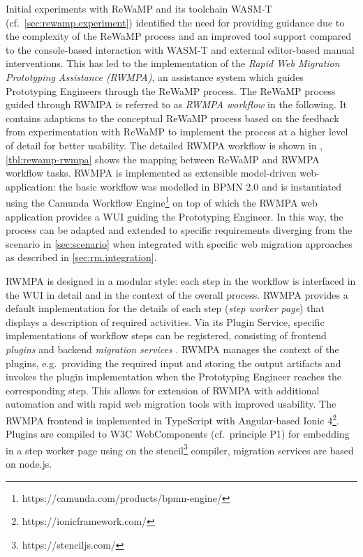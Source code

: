 Initial experiments with ReWaMP and its toolchain WASM-T (cf.~\cref{sec:rewamp.experiment}) identified the need for providing guidance due to the complexity of the ReWaMP process and an improved tool support compared to the console-based interaction with WASM-T and external editor-based manual interventions.
This has led to the implementation of the \emph{Rapid Web Migration Prototyping Assistance (RWMPA)}, an assistance system which guides Prototyping Engineers through the ReWaMP process.
The ReWaMP process guided through RWMPA is referred to as \emph{RWMPA workflow} in the following.
It contains adaptions to the conceptual ReWaMP process based on the feedback from experimentation with ReWaMP to implement the process at a higher level of detail for better usability.
The detailed RWMPA workflow is shown in , \cref{tbl:rewamp-rwmpa} shows the mapping between ReWaMP and RWMPA workflow tasks.
RWMPA is implemented as extensible model-driven web-application: the basic workflow was modelled in BPMN 2.0 and is instantiated using the Camunda Workflow Engine\footnote{https://camunda.com/products/bpmn-engine/} on top of which the RWMPA web application provides a WUI guiding the Prototyping Engineer.
In this way, the process can be adapted and extended to specific requirements diverging from the scenario in \cref{sec:scenario} when integrated with specific web migration approaches as described in \cref{sec:rm.integration}.

RWMPA is designed in a modular style: each step in the workflow is interfaced in the WUI in detail and in the context of the overall process.
RWMPA provides a default implementation for the details of each step (\emph{step worker page}) that displays a description of required activities.
Via its Plugin Service, specific implementations of workflow steps can be registered, consisting of frontend \emph{plugins} and backend \emph{migration services} .
RWMPA manages the context of the plugins, e.g.~providing the required input and storing the output artifacts and invokes the plugin implementation when the Prototyping Engineer reaches the corresponding step.
This allows for extension of RWMPA with additional automation and with rapid web migration tools with improved usability.
The RWMPA frontend is implemented in TypeScript with Angular-based Ionic 4\footnote{https://ionicframework.com/}.
Plugins are compiled to W3C WebComponents \autocite{W3C2018WebComponents} (cf.~principle P1) for embedding in a step worker page using on the stencil\footnote{https://stenciljs.com/} compiler, migration services are based on node.js.

